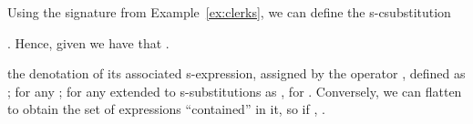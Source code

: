 \begin{example}
Using the signature from Example~\ref{ex:clerks}, we can define the s-csubstitution

. Hence, given
 we have that
  .
\end{example}

the denotation of its associated s-expression, assigned by the operator , defined as ;  for any ;  for any \shorttxt{, } extended to s-substitutions as , for .  Conversely, we can flatten  to obtain the set  of expressions ``contained'' in it, so \shorttxt{, } if ,  \longtxt{ ; }\shorttxt{, }. 
